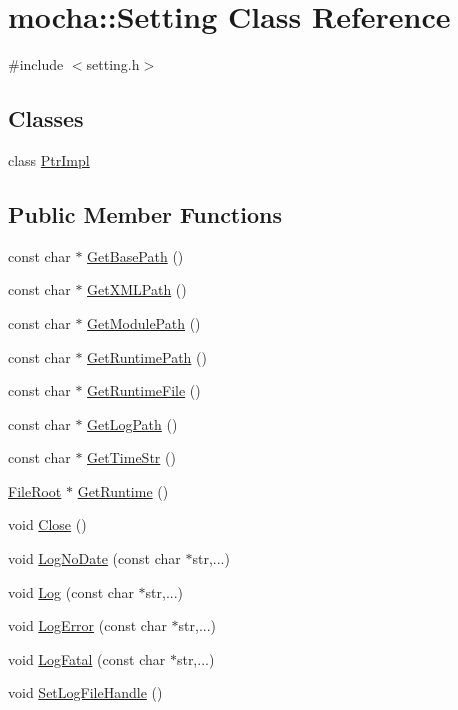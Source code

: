\hypertarget{classmocha_1_1_setting}{
\section{mocha::Setting Class Reference}
\label{classmocha_1_1_setting}
}


{\ttfamily \#include $<$setting.h$>$}

\subsection*{Classes}
\begin{DoxyCompactItemize}
\item 
class \hyperlink{classmocha_1_1_setting_1_1_ptr_impl}{PtrImpl}
\end{DoxyCompactItemize}
\subsection*{Public Member Functions}
\begin{DoxyCompactItemize}
\item 
const char $\ast$ \hyperlink{classmocha_1_1_setting_a564f1f9d3e9733dceafa201ca40fbfb5}{GetBasePath} ()
\item 
const char $\ast$ \hyperlink{classmocha_1_1_setting_a1d590cbfb42ddc0aceedf07fb285b2a3}{GetXMLPath} ()
\item 
const char $\ast$ \hyperlink{classmocha_1_1_setting_a798784a754282fc49752c4405e86c0b7}{GetModulePath} ()
\item 
const char $\ast$ \hyperlink{classmocha_1_1_setting_aaa4fa9b03df84444846d01c6ecce2add}{GetRuntimePath} ()
\item 
const char $\ast$ \hyperlink{classmocha_1_1_setting_a6ad858f5912afd49746b6d43fab96e9f}{GetRuntimeFile} ()
\item 
const char $\ast$ \hyperlink{classmocha_1_1_setting_a57d376e6f156c0b0895273b6213ee542}{GetLogPath} ()
\item 
const char $\ast$ \hyperlink{classmocha_1_1_setting_af64bf60e08098fed22f7f84698e1a97d}{GetTimeStr} ()
\item 
\hyperlink{classmocha_1_1_file_root}{FileRoot} $\ast$ \hyperlink{classmocha_1_1_setting_a4f04773eb84489840ad3996894041f22}{GetRuntime} ()
\item 
void \hyperlink{classmocha_1_1_setting_af370dd8d958c35ebaae595702f96ca1e}{Close} ()
\item 
void \hyperlink{classmocha_1_1_setting_acbb0b0676135cf7e0b634b62f022ecd0}{LogNoDate} (const char $\ast$str,...)
\item 
void \hyperlink{classmocha_1_1_setting_aea839d6705b1cc04db741630407de2cc}{Log} (const char $\ast$str,...)
\item 
void \hyperlink{classmocha_1_1_setting_a6b5e982cdafe595ad0a512d2c7f4516a}{LogError} (const char $\ast$str,...)
\item 
void \hyperlink{classmocha_1_1_setting_adcf1d82a921242609295465ea8f5e793}{LogFatal} (const char $\ast$str,...)
\item 
void \hyperlink{classmocha_1_1_setting_a5259b61aa7451aeda71451d05c02a072}{SetLogFileHandle} ()
\end{DoxyCompactItemize}
